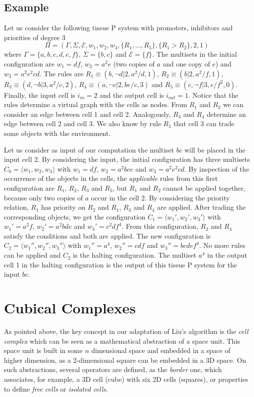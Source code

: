 \documentclass[journal]{IEEEtran}
\begin{document}
\subsection{Example} \label{sec:example}
Let us consider the following tissue P system with promoters,
inhibitors and priorities of degree 3
$$\Pi=(\Gamma,\Sigma,\mathcal{E},w_1,w_2,w_3,\{R_1, \ldots, R_5\},\{R_1>R_2\},2,1)$$
\noindent where $\Gamma=\{a,b,c,d,e,f\}$, $\Sigma=\{b,c\}$ and
$\mathcal{E}=\{f\}$. The multisets in the initial configuration are
$w_1=df$, $w_2=a^2e$ (two copies of $a$ and one copy of $e$) and $w_3=a^2e^2cd$.
The rules are $R_1\equiv (b,\neg d|2,a^2/d,1)$, $R_2\equiv (b |2,a^2/f,1)$,
$R_3\equiv (d,\neg b| 3,a^2/c,2)$, $R_4\equiv (a,\neg c| 2,be/c,3)$ and
$R_5\equiv (c,\neg f |3,e/f^2,0)$. Finally, the input cell is $i_{in}=2$ and the
output cell is $i_{out}=1$. Notice that the rules determine a virtual graph with
the cells as nodes. From $R_1$ and $R_2$ we can consider an edge between cell 1
and cell 2. Analogously, $R_3$ and $R_4$ determine an edge between cell 2 and
cell 3. We also know by rule $R_5$ that cell 3 can trade some objects with the
environment.

Let us consider as input of our computation the multiset $bc$ will
be placed in the input cell 2. By considering the input, the initial
configuration has three multisets $C_0=\langle w_1,w_2,w_3\rangle$
with $w_1=df$, $w_2=a^2bce$ and $w_3=a^2e^2cd$. By inspection of the occurrence of the objects in the cells, the {\it applicable} rules from
this first configuration are $R_1$, $R_2$, $R_3$ and $R_5$, but
$R_1$ and $R_2$ cannot be applied together, because only two copies
of $a$ occur in the cell 2. By considering the priority relation,
$R_1$ has priority on $R_2$ and $R_1$, $R_3$ and $R_4$ are applied.
After trading the corresponding objects, we get the configuration
$C_1=\langle w_1',w_2',w_3'\rangle$ with $w_1'=a^2f$, $w_2'=a^2bde$
and $w_3'=c^2df^4$. From this configuration, $R_2$
and $R_4$ satisfy the conditions and both are applied. The new
configuration is $C_2=\langle w_1'',w_2'',w_3''\rangle$ with
$w_1''=a^4$, $w_2''=cdf$ and $w_3''=bcdef^4$. No more rules can be
applied and $C_2$ is the halting configuration. The multiset $a^4$
in the output cell 1 in the halting configuration is the output of
this tissue P system for the input $bc$.

\section{Cubical Complexes}\label{sec:CC}
As pointed above, the key concept in our adaptation of Liu's
algorithm is the {\it cell complex} which can be seen as a
mathematical abstraction of a space unit. This space unit is built
in some $n$ dimensional space and embedded in a space of higher
dimension, as a 2-dimensional square can be embedded in a 3D space.
On such abstractions, several operators are defined, as the
\emph{border} one, which associates, for example, a 3D cell (cube)
with six 2D cells (squares), or properties to define \emph{free
cells} or \emph{isolated cells}.
\end{document}
